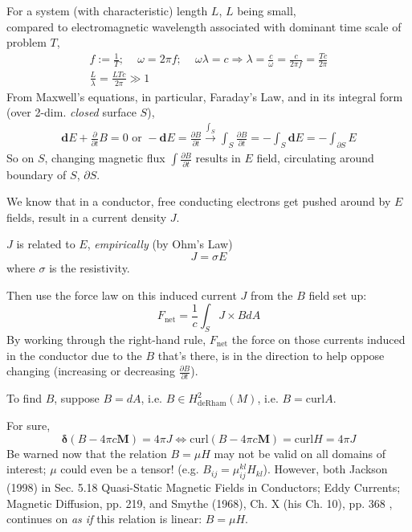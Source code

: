 \documentclass[10pt]{amsart}
\begin{document}
\begin{multicols*}{2}
For a system (with characteristic) length $L$, $L$ being small, \\
compared to electromagnetic wavelength associated with dominant time scale of problem $T$, 
\[
\begin{gathered}
	f := \frac{1}{T} ; \quad \, \omega = 2\pi f ; \quad \, \omega \lambda = c \Longrightarrow \lambda = \frac{c}{ \omega } = \frac{c}{ 2\pi f } = \frac{Tc}{2\pi }  \\
\frac{L}{\lambda} = \frac{LTc}{2\pi } \gg 1
\end{gathered}
\]
From Maxwell's equations, in particular, Faraday's Law, and in its integral form (over 2-dim. \emph{closed} surface $S$), 
\begin{equation}
\begin{gathered}
\mathbf{d}E + \frac{ \partial }{ \partial t } B = 0 \text{ or } -\mathbf{d}E =\frac{ \partial B}{ \partial t} \xrightarrow{ \int_S } \int_S \frac{ \partial B}{ \partial t} = -\int_S \mathbf{d}E = -\int_{\partial S} E
\end{gathered}
\end{equation}
So on $S$, changing magnetic flux $\int \frac{ \partial B}{ \partial t}$ results in $E$ field, circulating around boundary of $S$, $\partial S$.  

We know that in a conductor, free conducting electrons get pushed around by $E$ fields, result in a current density $J$.  

$J$ is related to $E$, \emph{empirically} (by Ohm's Law)
\[
J = \sigma E
\]
where $\sigma$ is the resistivity.  

Then use the force law on this induced current $J$ from the $B$ field set up:
\[
F_{\text{net}} = \frac{1}{c} \int_S J\times B dA
\]
By working through the right-hand rule, $F_{\text{net}}$ the force on those currents induced in the conductor due to the $B$ that's there, is in the direction to help oppose changing (increasing or decreasing $\frac{\partial B}{ \partial t}$).  

To find $B$, suppose $B=dA$, i.e. $B\in H^2_{\text{deRham}}(M)$, i.e. $B=\text{curl}A$.  

For sure, 
\[
\mathbf{\delta} (B-4\pi c \mathbf{M}) = 4\pi J \Longleftrightarrow \text{curl}(B-4\pi c \mathbf{M} ) = \text{curl} H = 4\pi J
\]
Be warned now that the relation $B=\mu H$ may not be valid on all domains of interest; $\mu$ could even be a tensor! (e.g. $B_{ij} = \mu^{kl}_{ij} H_{kl}$).  However, both Jackson (1998) \cite{Jack1998} in Sec. 5.18 Quasi-Static Magnetic Fields in Conductors; Eddy Currents; Magnetic Diffusion, pp. 219, and Smythe (1968), Ch. X (his Ch. 10), pp. 368 \cite{Smyt1968}, continues on \emph{as if} this relation is linear: $B=\mu H$.  


\end{multicols*}
\end{document}
